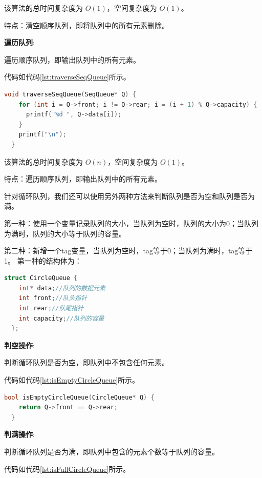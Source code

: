 \documentclass[lang=cn,newtx,10pt,scheme=chinese]{../elegantbook}
\begin{document}
该算法的总时间复杂度为 $O(1)$，空间复杂度为 $O(1)$。

特点：清空顺序队列，即将队列中的所有元素删除。

\textbf{遍历队列}:

遍历顺序队列，即输出队列中的所有元素。

代码如代码\ref{lst:traverseSeqQueue}所示。

\begin{lstlisting}[language=C++, caption={遍历队列示例代码}, label={lst:traverseSeqQueue}]
  void traverseSeqQueue(SeqQueue* Q) {
    for (int i = Q->front; i != Q->rear; i = (i + 1) % Q->capacity) {
      printf("%d ", Q->data[i]);
    }
    printf("\n");
  }

\end{lstlisting}

该算法的总时间复杂度为 $O(n)$，空间复杂度为 $O(1)$。

特点：遍历顺序队列，即输出队列中的所有元素。

针对循环队列，我们还可以使用另外两种方法来判断队列是否为空和队列是否为满。

第一种：使用一个变量记录队列的大小，当队列为空时，队列的大小为0；当队列为满时，队列的大小等于队列的容量。

第二种：新增一个tag变量，当队列为空时，tag等于0；当队列为满时，tag等于1。
第一种的结构体为：

\begin{lstlisting}[language=C++, caption={循环队列结构体定义}, label={lst:circleQueueStruct}]
  struct CircleQueue {
    int* data;//队列的数据元素
    int front;//队头指针
    int rear;//队尾指针
    int capacity;//队列的容量
  };
\end{lstlisting}

\textbf{判空操作}:

判断循环队列是否为空，即队列中不包含任何元素。

代码如代码\ref{lst:isEmptyCircleQueue}所示。

\begin{lstlisting}[language=C++, caption={判断循环队列是否为空示例代码}, label={lst:isEmptyCircleQueue}]
  bool isEmptyCircleQueue(CircleQueue* Q) {
    return Q->front == Q->rear;
  }

\end{lstlisting}

\textbf{判满操作}:

判断循环队列是否为满，即队列中包含的元素个数等于队列的容量。

代码如代码\ref{lst:isFullCircleQueue}所示。
\end{document}
